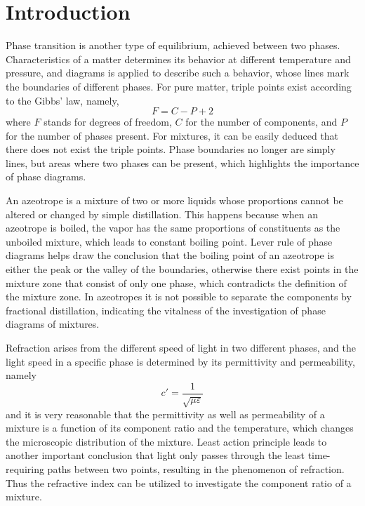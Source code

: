 \documentclass[%
 reprint,
 amsmath,amssymb,
 aps,
10.5pt,
]{revtex4-1}
\begin{document}
\tableofcontents

\section{Introduction}
Phase transition is another type of equilibrium, achieved between two phases. Characteristics of a matter determines its behavior at different temperature and pressure, and diagrams is applied to describe such a behavior, whose lines mark the boundaries of different phases. For pure matter, triple points exist according to the Gibbs' law, namely,
\begin{equation}
F = C- P +2
\end{equation}
where $F$ stands for degrees of freedom, $C$ for the number of components, and $P$ for the number of phases present. For mixtures, it can be easily deduced that there does not exist the triple points. Phase boundaries no longer are simply lines, but areas where two phases can be present, which highlights the importance of phase diagrams.

An azeotrope is a mixture of two or more liquids whose proportions cannot be altered or changed by simple distillation. This happens because when an azeotrope is boiled, the vapor has the same proportions of constituents as the unboiled mixture, which leads to constant boiling point. Lever rule of phase diagrams helps draw the conclusion that the boiling point of an azeotrope is either the peak or the valley of the boundaries, otherwise there exist points in the mixture zone that consist of only one phase, which contradicts the definition of the mixture zone. In azeotropes it is not possible to separate the components by fractional distillation, indicating the vitalness of the investigation of phase diagrams of mixtures.

Refraction arises from the different speed of light in two different phases, and the light speed in a specific phase is determined by its permittivity and permeability, namely
\begin{equation}
c' = \frac{1}{\sqrt{\mu\varepsilon}}
\end{equation}
and it is very reasonable that the permittivity as well as permeability of a mixture is a function of its component ratio and the temperature, which changes the microscopic distribution of the mixture. Least action principle leads to another important conclusion that light only passes through the least time-requiring paths between two points, resulting in the phenomenon of refraction. Thus the refractive index can be utilized to investigate the component ratio of a mixture.
\end{document}

